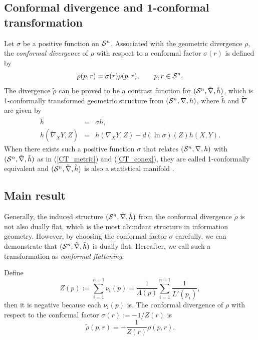 \documentclass{llncs}
\begin{document}
\subsection{Conformal divergence and 1-conformal transformation}
Let $\sigma$ be a positive function on ${\cal S}^n$.
Associated with the geometric divergence $\rho$, 
the {\em conformal divergence} \cite{Kurose94} of $\rho$ 
with respect to a conformal factor 
$\sigma(r)$ is defined by
\begin{equation}
	\tilde \rho(p,r)= \sigma(r) \rho(p,r), \qquad p, r \in {\cal S}^n.
\label{conf_div}
\end{equation}
The divergence $\tilde \rho$ can be proved  
to be a contrast function for $({\cal S}^n,\tilde \nabla, \tilde h)$, 
which is 1-conformally transformed geometric structure 
from $({\cal S}^n,\nabla,h)$,
where $\tilde h$ and $\tilde \nabla$ are given by
\begin{eqnarray}
	\tilde h&=& \sigma h, 
\label{CT_metric} 
\\
	h(\tilde \nabla_X Y, Z)&=& h(\nabla_X Y, Z)-d(\ln \sigma)(Z)h(X,Y).
\label{CT_conex}
\end{eqnarray}
When there exists such a positive function $\sigma$ that relates 
$({\cal S}^n,\nabla,h)$ with $({\cal S}^n,\tilde \nabla, \tilde h)$ as in 
(\ref{CT_metric}) and (\ref{CT_conex}), 
they are called 1-conformally equivalent and 
$({\cal S}^n,\tilde \nabla, \tilde h)$ is also a statistical manifold 
\cite{Kurose94}.

	
\subsection{Main result}

Generally, the induced structure $({\cal S}^n,\tilde \nabla, \tilde h)$ 
from the conformal divergence $\tilde \rho$ 
is not also dually flat, which is 
the most abundant structure in information geometry.
However, by choosing the conformal factor $\sigma$ carefully, 
we can demonstrate that $({\cal S}^n,\tilde \nabla, \tilde h)$ is dually flat. 
Hereafter, we call such a transformation as {\em conformal flattening}.

Define
\[
	Z(p):= \sum_{i=1}^{n+1} \nu_i(p)
	=\frac{1}{\Lambda(p)}\sum_{i=1}^{n+1} \frac{1}{L'(p_i)},
\]
then it is negative because each $\nu_i(p)$ is.
The conformal divergence of $\rho$ with respect to the conformal factor 
$\sigma(r):=-1/Z(r)$ is
\[
	\tilde \rho(p,r)= -\frac{1}{Z(r)}\rho(p,r).
\]
%
\end{document}
